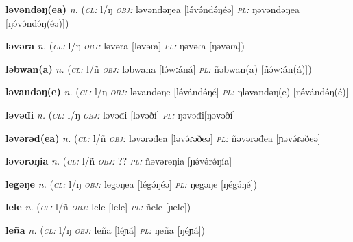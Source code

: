 \newentry
\headword\textbf{ləvəndəŋ(ea)} 
\ipa{[lə́və́ndə́ŋ(éə)]}
\synpos\textit{n.} 
\class(\textit{\textsc{cl:}} {l/ŋ}
\object\textit{\textsc{obj:}} ləvəndəŋea [lə́və́ndə́ŋéə]
\plural\textit{\textsc{pl:}} ŋəvəndəŋea [ŋə́və́ndə́ŋ(éə)])

\newentry
\headword\textbf{ləvəra} 
\ipa{[ləvəɾa]}
\synpos\textit{n.} 
\class(\textit{\textsc{cl:}} {l/ŋ}
\object\textit{\textsc{obj:}} ləvəra [ləvəɾa]
\plural\textit{\textsc{pl:}} ŋəvəɾa [ŋəvəɾa])


\newentry
\headword\textbf{ləbwan(a)} 
\ipa{[lə́wːán(á)]}
\synpos\textit{n.} 
\class(\textit{\textsc{cl:}} {l/ñ}
\object\textit{\textsc{obj:}} ləbwana [lə́wːáná]
\plural\textit{\textsc{pl:}} ñəbwan(a) [ñə́wːán(á)])


\newentry
\headword\textbf{ləvandəŋ(e)} 
\ipa{[lə́vándə́ŋ(é)]}
\synpos\textit{n.} 
\class(\textit{\textsc{cl:}} {l/ŋ}
\object\textit{\textsc{obj:}} ləvandəŋe [lə́vándə́ŋé]
\plural\textit{\textsc{pl:}} ŋləvandəŋ(e) [ŋə́vándə́ŋ(é)]


\newentry
\headword\textbf{ləvəđi} 
\ipa{[ləvəðí]}
\synpos\textit{n.} 
\class(\textit{\textsc{cl:}} {l/ŋ}
\object\textit{\textsc{obj:}} ləvəđi [ləvəðí]
\plural\textit{\textsc{pl:}} ŋəvəđi[ŋəvəðí]

\newentry
\headword\textbf{ləvərəđ(ea)} 
\synpos\textit{n.} 
\class(\textit{\textsc{cl:}} {l/ñ}
\object\textit{\textsc{obj:}} ləvərəđea [ləvə́ɾəðeə]
\plural\textit{\textsc{pl:}} ñəvərəđea [ɲəvə́ɾəðeə]

\newentry
\headword\textbf{ləvərəŋia} 
\ipa{[lə́və́rə́ŋía]}
\synpos\textit{n.} 
\class(\textit{\textsc{cl:}} {l/ñ}
\object\textit{\textsc{obj:}} ??
\plural\textit{\textsc{pl:}} ñəvərəŋia [ɲə́və́rə́ŋía]


\newentry
\headword\textbf{legəŋe} 
\ipa{[légə́ŋé]}
\synpos\textit{n.} 
\class(\textit{\textsc{cl:}} {l/ŋ}
\object\textit{\textsc{obj:}} legəŋea [légə́ŋéə]
\plural\textit{\textsc{pl:}} ŋegəŋe [ŋégə́ŋé])

\newentry
\headword\textbf{lele} 
\ipa{[lele]}
\synpos\textit{n.} 
\class(\textit{\textsc{cl:}} {l/ñ}
\object\textit{\textsc{obj:}} lele [lele]
\plural\textit{\textsc{pl:}} ñele [ɲele])

\newentry
\headword\textbf{leña} 
\ipa{[léɲá]}
\synpos\textit{n.} 
\class(\textit{\textsc{cl:}} {l/ŋ}
\object\textit{\textsc{obj:}} leña [léɲá]
\plural\textit{\textsc{pl:}} ŋeña [ŋéɲá])
 
